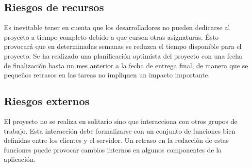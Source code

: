 \subsection{Riesgos de recursos}

Es inevitable tener en cuenta que los desarrolladores no pueden dedicarse al
proyecto a tiempo completo debido a que cursen otras asignaturas. Ésto
provocará que en determinadas semanas se reduzca el tiempo disponible para el
proyecto. Se ha realizado una planificación optimista del proyecto con una fecha
de finalización hasta un mes anterior a la fecha de entrega final, de manera
que se pequeños retrasos en las tareas no impliquen un impacto importante.

\subsection{Riesgos externos}

El proyecto no se realiza en solitario sino que interacciona con otros grupos de
trabajo. Esta interacción debe formalizarse con un conjunto de funciones bien
definidas entre los clientes y el servidor. Un retraso en la redacción de estas
funciones puede provocar cambios internos en algunos componentes de la
aplicación.
